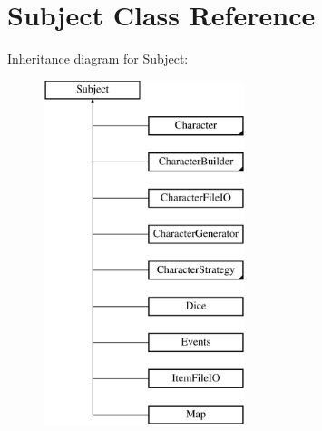 \hypertarget{class_subject}{}\section{Subject Class Reference}
\label{class_subject}
Inheritance diagram for Subject\+:\begin{figure}[H]
\begin{center}
\leavevmode
\includegraphics[height=10.000000cm]{class_subject}
\end{center}
\end{figure}
